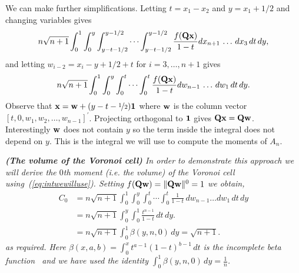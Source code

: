\documentclass[draftcls, onecolumn, 11pt]{IEEEtran}
\begin{document}
We can make further simplifications.  Letting $t = x_1 - x_2$ and $y = x_1 + 1/2$ and changing variables gives
\[
n \sqrt{n+1} \int^{1}_{0} \int^{y}_{0}  \int^{y - 1/2}_{y - t - 1/2} \cdots \int^{y-1/2}_{y-t-1/2} \frac{f(\mathbf{Q}\mathbf{x} )}{1 - t}  dx_{n+1} \, \dots \, dx_3 \, dt \, dy,
\]
and letting $w_{i-2} = x_i - y + 1/2 + t$ for $i = 3,\dots,n+1$ gives
\begin{equation}\label{eq:intwewilluse}
n \sqrt{n+1} \int^{1}_{0} \int^{y}_{0}  \int^{t}_{0} \cdots \int^{t}_{0} \frac{f(\Qbf\xbf )}{1 - t}  dw_{n-1} \, \dots \, dw_1 \, dt \, dy.
\end{equation}
Observe that $\mathbf{x} = \mathbf{w} + (y - t - \nicefrac{1}{2})\boldsymbol{1}$ where $\mathbf{w}$ is the column vector $[t, 0, w_1, w_2, \dots, w_{n-1}]^\prime$.  Projecting orthogonal to $\boldsymbol{1}$ gives $\mathbf{Q}\mathbf{x} = \mathbf{Q} \mathbf{w}$.  Interestingly $\mathbf{w}$ does not contain $y$ so the term inside the integral does not depend on $y$.  This is the integral we will use to compute the moments of $A_n$. 
 
\begin{example}\emph{\textbf{(The volume of the Voronoi cell)}
In order to demonstrate this approach we will derive the $0$th moment (i.e. the volume) of the Voronoi cell using~(\ref{eq:intwewilluse}).  Setting $f(\mathbf{Q}\mathbf{w}) = \|\mathbf{Q}\mathbf{w}\|^0 = 1$ we obtain,
\begin{align*}
C_0 &= n\sqrt{n+1} \int^{1}_{0} \int^{y}_{0} \int^{t}_{0} \cdots \int^{t}_{0} \frac{1}{1 - t} \,dw_{n-1}\dots dw_1 \, dt  \, dy\\
 &= n\sqrt{n+1} \int^{y}_{0} \int_{0}^{1}  \frac{t^{n-1}}{1 - t} \, dt  \, dy. \\
&= n\sqrt{n+1}  \int^{1}_{0} \beta(y, n, 0) \, dy = \sqrt{n+1}.
\end{align*}
as required.  Here $\beta(x,a,b) =  \int_{0}^{x}  t^{a-1}(1 - t)^{b-1} \,dt$ is the incomplete beta function~\cite{Pearson_tables_of_beta_functions} and we have used the identity $\int^{1}_{0} \beta(y, n, 0) \, dy = \frac{1}{n}$.}
\end{example}

\end{document}
